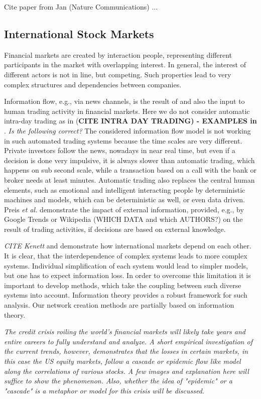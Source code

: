 \documentclass[a4paper,10pt]{scrbook}
\begin{document}
Cite paper from Jan (Nature Communications) ...

\subsection{International Stock Markets}
Financial markets are created by interaction people, representing different participants in the market with overlapping interest. In general, the interest of different actors is not in line, but competing. Such properties lead to very complex structures and dependencies between companies.
 
Information flow, e.g., via news channels, is the result of and also the input to human trading activity in financial markets. Here we do not consider automatic intra-day trading as in (\textbf{CITE INTRA DAY TRADING) - EXAMPLES in \cite{Zheng2004}}. \textit{Is the following correct? }The considered information flow model is not working in such automated trading systems because the time scales are very different. Private investors follow the news, nowadays in near real time, but even if a decision is done very impulsive, it is always slower than automatic trading, which happens on sub second scale, while a transaction based on a call with the bank or broker needs at least minutes. Automatic trading also replaces the central human elements, such as emotional and intelligent interacting people by deterministic machines and models, which can be deterministic as well, or even data driven. Preis \textit{et al.} demonstrate the impact of external information, provided, e.g., by Google Trends or Wikipedia (WHICH DATA and which AUTHORS?) on the result of trading activities, if decisions are based on external knowledge. 

\textit{CITE Kenett} and \cite{abc} demonstrate how international markets depend on each other. It is clear, that the interdependence of complex systems leads to more complex systems. Individual simplification of each system would lead to simpler models, but one has to expect information loss. In order to overcome this limitation it is important to develop methods, which take the coupling between such diverse systems into account. Information theory provides a robust framework for such analysis. Our network creation methods are partially based on information theory.

\cite{Smith2009}
%
%
\textit{The credit crisis roiling the world's financial markets will likely take years and entire careers to fully understand and analyze. A short empirical investigation of the current trends, however, demonstrates that the losses in certain markets, in this case the US equity markets, follow a cascade or epidemic flow like model along the correlations of various stocks. A few images and explanation here will suffice to show the phenomenon. Also, whether the idea of "epidemic" or a "cascade" is a metaphor or model for this crisis will be discussed.}
\end{document}
